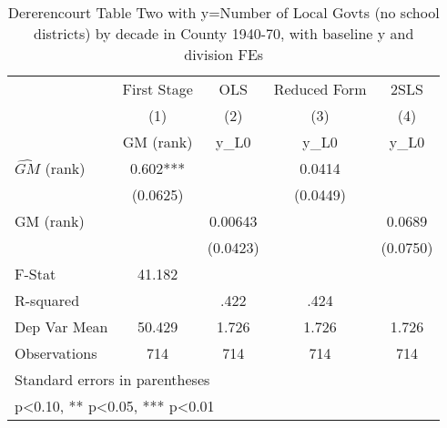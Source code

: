 \begin{table}[htbp]\centering
\def\sym#1{\ifmmode^{#1}\else\(^{#1}\)\fi}
\caption{Dererencourt Table Two with y=Number of Local Govts (no school districts) by decade in County 1940-70, with baseline y and division FEs}
\begin{tabular}{l*{4}{c}}
\toprule
                    & First Stage   &         OLS   &Reduced Form   &        2SLS   \\
                    &\multicolumn{1}{c}{(1)}&\multicolumn{1}{c}{(2)}&\multicolumn{1}{c}{(3)}&\multicolumn{1}{c}{(4)}\\
                    &\multicolumn{1}{c}{GM  (rank)}&\multicolumn{1}{c}{y\_L0}&\multicolumn{1}{c}{y\_L0}&\multicolumn{1}{c}{y\_L0}\\
\midrule
$\hat{GM}$ (rank)   &       0.602***&               &      0.0414   &               \\
                    &    (0.0625)   &               &    (0.0449)   &               \\
\addlinespace
GM  (rank)          &               &     0.00643   &               &      0.0689   \\
                    &               &    (0.0423)   &               &    (0.0750)   \\
\midrule
F-Stat              &      41.182   &               &               &               \\
R-squared           &               &        .422   &        .424   &               \\
Dep Var Mean        &      50.429   &       1.726   &       1.726   &       1.726   \\
Observations        &         714   &         714   &         714   &         714   \\
\bottomrule
\multicolumn{5}{l}{\footnotesize Standard errors in parentheses}\\
\multicolumn{5}{l}{\footnotesize * p<0.10, ** p<0.05, *** p<0.01}\\
\end{tabular}
\end{table}

